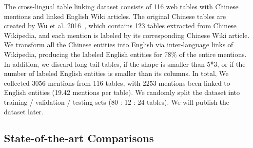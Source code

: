 The cross-lingual table linking dataset consists of 116 web tables with
Chinese mentions and linked English Wiki articles.
The original Chinese tables are created by Wu et al. 2016~,
which contains 123 tables extracted from Chinese Wikipedia, and each mention is labeled by
its corresponding Chinese Wiki article.
We transform all the Chinese entities into English via inter-language links of Wikipedia,
producing the labeled English entities for 78\% of the entire mentions.
In addition, we discard long-tail tables, if the shape is smaller than 5*3, 
or if the number of labeled English entities is smaller than its columns.
In total, We collected 3056 mentions from 116 tables,
with 2253 mentions been linked to English entities (19.42 mentions per table).
We randomly split the dataset into training / validation / testing sets (80 : 12 : 24 tables).
We will publish the dataset later.




\subsection{State-of-the-art Comparisons}
\label{exp:soat}

